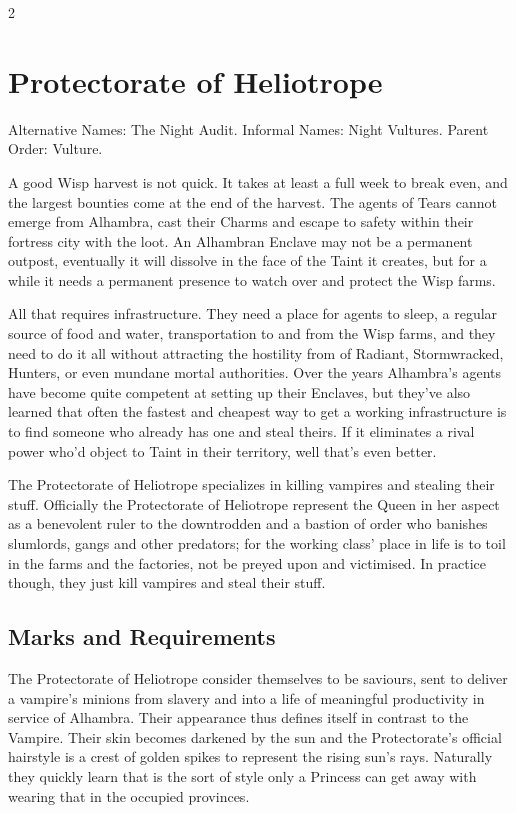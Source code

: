 \begin{multicols}{2}
\section*{Protectorate of Heliotrope}
\label{sec:Heliotrope}

Alternative Names: The Night Audit.  
Informal Names: Night Vultures.
Parent Order: Vulture.

A good Wisp harvest is not quick. It takes at least a full week to break even, and the largest bounties come at the end of the harvest. The agents of Tears cannot emerge from Alhambra, cast their Charms and escape to safety within their fortress city with the loot. An Alhambran Enclave may not be a permanent outpost, eventually it will dissolve in the face of the Taint it creates, but for a while it needs a permanent presence to watch over and protect the Wisp farms.

All that requires infrastructure. They need a place for agents to sleep, a regular source of food and water, transportation to and from the Wisp farms, and they need to do it all without attracting the hostility from of Radiant, Stormwracked, Hunters, or even mundane mortal authorities. Over the years Alhambra's agents have become quite competent at setting up their Enclaves, but they've also learned that often the fastest and cheapest way to get a working infrastructure is to find someone who already has one and steal theirs. If it eliminates a rival power who'd object to Taint in their territory, well that's even better.

The Protectorate of Heliotrope specializes in killing vampires and stealing their stuff. Officially the Protectorate of Heliotrope represent the Queen in her aspect as a benevolent ruler to the downtrodden and a bastion of order who banishes slumlords, gangs and other predators; for the working class' place in life is to toil in the farms and the factories, not be preyed upon and victimised. In practice though, they just kill vampires and steal their stuff.

\subsection*{Marks and Requirements}

The Protectorate of Heliotrope consider themselves to be saviours, sent to deliver a vampire's minions from slavery and into a life of meaningful productivity in service of Alhambra. Their appearance thus defines itself in contrast to the Vampire. Their skin becomes darkened by the sun and the Protectorate's official hairstyle is a crest of golden spikes to represent the rising sun's rays. Naturally they quickly learn that is the sort of style only a Princess can get away with wearing that in the occupied provinces.


\end{multicols}
